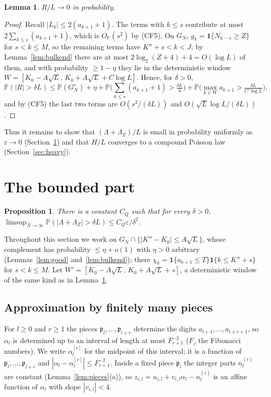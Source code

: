\documentclass[11pt]{amsart}
\newtheorem{proposition}[theorem]{Proposition}
\newtheorem{lemma}[theorem]{Lemma}
\theoremstyle{definition}
\numberwithin{equation}{section}
\newcommand{\Prob}{\mathbb{P}}
\newcommand{\fp}{\mathfrak{p}}
\newcommand{\eps}{\varepsilon}
\newcommand{\ind}{\mathbf{1}}
\begin{document}
\begin{lemma}\label{lem:R}
$R/L\to0$ in probability.
\end{lemma}

\begin{proof}
Recall $|L_k|\le2(a_{k+1}+1)$. The terms with $k\le s$ contribute at most $2\sum_{k\le s}(a_{k+1}+1)$, which is $O_\Prob(s^2)$ by (CF5).
On $G_N$, $g_k=\ind\{N_{k-s}\ge Z\}$ for $s<k\le M$, so the remaining terms have $K''+s<k<J$; by Lemma~\ref{lem:bulkend} there are at most
$2\log_2(Z+4)+4=O(\log L)$ of them, and with probability $\ge1-\eta$ they lie in the deterministic window
$W=[K_0-A\sqrt L,\,K_0+A\sqrt L+C\log L]$. Hence, for $\delta>0$,
\[
\Prob(|R|>\delta L)\le\Prob(G_N^c)+\eta+\Prob\Big(\sum_{k\le s}(a_{k+1}+1)>\tfrac{\delta L}4\Big)+\Prob\Big(\max_{k\in W}a_{k+1}>\tfrac{\delta L}{C'\log L}\Big),
\]
and by (CF5) the last two terms are $O(s^2/(\delta L))$ and $O(\sqrt L\log L/(\delta L))$.
\end{proof}

Thus it remains to show that $(\Lambda+\Lambda_Z)/L$ is small in probability uniformly as $\eps\to0$ (Section~\ref{sec:light}) and that $H/L$
converges to a compound Poisson law (Section~\ref{sec:heavy}).
\section{The bounded part}\label{sec:light}

\begin{proposition}\label{prop:light}
There is a constant $C_Q$ such that for every $\delta>0$, $\limsup_{N\to\infty}\Prob(|\Lambda+\Lambda_Z|>\delta L)\le C_Q\eps/\delta^2$.
\end{proposition}

Throughout this section we work on $G_N\cap\{|K''-K_0|\le A\sqrt L\}$, whose complement has probability $\le\eta+o(1)$ with $\eta>0$ arbitrary
(Lemmas~\ref{lem:good} and~\ref{lem:bulkend}); there $\chi_k=\ind\{a_{k+1}\le T\}\ind\{k\le K''+s\}$ for $s<k\le M$. Let
$W'=[K_0-A\sqrt L,\,K_0+A\sqrt L+s]$, a deterministic window of the same kind as in Lemma~\ref{lem:R}.

\subsection{Approximation by finitely many pieces}
For $l\ge0$ and $r\ge1$ the pieces $\fp_l,\dots,\fp_{l+r}$ determine the digits $a_{l+1},\dots,a_{l+r+1}$, so $\alpha_l$ is determined up to an interval of
length at most $F_{r+1}^{-2}$ ($F_j$ the Fibonacci numbers). We write $\alpha_l^{[r]}$ for the midpoint of this interval; it is a function of
$\fp_l,\dots,\fp_{l+r}$ and $|\alpha_l-\alpha_l^{[r]}|\le F_{r+1}^{-2}$. Inside a fixed piece $\fp_l$ the integer parts $n^{(i)}_l$ are constant
(Lemma~\ref{lem:pieces}(a)), so $z_{i,l}=u_{i,l}+v_{i,l}\alpha_l-n^{(i)}_l$ is an affine function of $\alpha_l$ with slope $|v_{i,l}|<4$.
\end{document}
